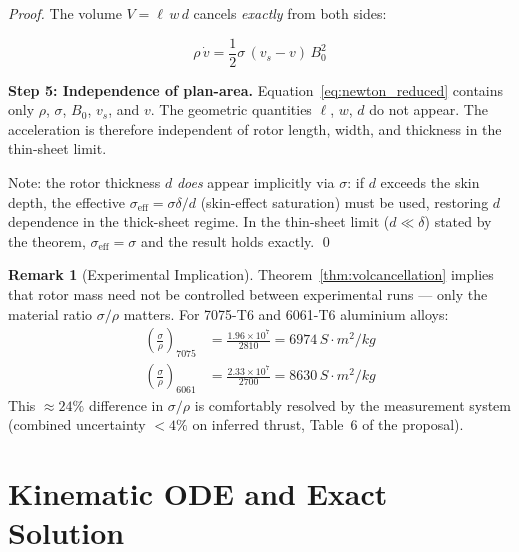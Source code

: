 \documentclass[12pt, a4paper]{article}
\theoremstyle{plain}
\theoremstyle{definition}
\newtheorem{remark}[theorem]{Remark}
\newcommand{\sig}{\sigma}
\begin{document}
\begin{proof}
  The volume $V = \ell\,w\,d$ cancels \emph{exactly} from both sides:

  \begin{tcolorbox}[colback=yellow!10, colframe=orange!60]
  \begin{equation}
    \boxed{
      \rho\,\dot{v} = \frac{1}{2}\sig\,(v_s - v)\,B_0^2
    }
    \label{eq:newton_reduced}
  \end{equation}
  \end{tcolorbox}

  \textbf{Step 5: Independence of plan-area.}
  Equation~\eqref{eq:newton_reduced} contains only $\rho$, $\sig$, $B_0$, $v_s$,
  and $v$. The geometric quantities $\ell$, $w$, $d$ do not appear. The acceleration
  is therefore independent of rotor length, width, and thickness in the thin-sheet
  limit.
  
  Note: the rotor thickness $d$ \emph{does} appear implicitly via $\sig$: if $d$
  exceeds the skin depth, the effective $\sig_{\mathrm{eff}} = \sig\delta/d$ (skin-effect
  saturation) must be used, restoring $d$ dependence in the thick-sheet regime.
  In the thin-sheet limit ($d \ll \delta$) stated by the theorem, $\sig_{\mathrm{eff}}
  = \sig$ and the result holds exactly. \qed
\end{proof}

\begin{remark}[Experimental Implication]
  Theorem~\ref{thm:volcancellation} implies that rotor mass need not be controlled
  between experimental runs — only the material ratio $\sig/\rho$ matters.
  For 7075-T6 and 6061-T6 aluminium alloys:
  \begin{align}
    \left(\frac{\sig}{\rho}\right)_{7075}
      &= \frac{1.96\times10^7}{2810} = 6974\,\si{S\cdot m^2 / kg} \\
    \left(\frac{\sig}{\rho}\right)_{6061}
      &= \frac{2.33\times10^7}{2700} = 8630\,\si{S\cdot m^2 / kg}
  \end{align}
  This $\approx 24\%$ difference in $\sig/\rho$ is comfortably resolved by the
  measurement system (combined uncertainty $< 4\%$ on inferred thrust,
  Table~6 of the proposal).
\end{remark}


\section{Kinematic ODE and Exact Solution}
\label{sec:kinematics}
\end{document}
